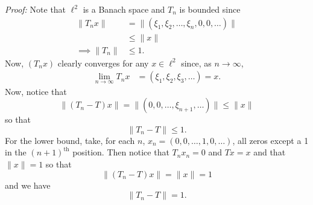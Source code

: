 \documentclass{article}
\begin{document}
\begin{itemize}
    \newline\newline
    \textit{Proof:} Note that $\ell^2$ is a Banach space and $T_n$ is bounded since
    \begin{align*}
        \|T_nx\| &= \|(\xi_1,\xi_2,\dots, \xi_n, 0, 0,\dots)\|\\
        &\leq \|x\|\\
        \implies \|T_n\| &\leq 1.
    \end{align*}
    Now, $(T_nx)$ clearly converges for any $x \in \ell^2$ since, as $n\to \infty$, 
    \begin{align*}
        \lim_{n\to \infty} T_nx &= (\xi_1,\xi_2,\xi_3,\dots) = x.
    \end{align*}
    Now, notice that 
    \[\|(T_n - T)x\| = \|(0,0,\dots, \xi_{n+1}, \dots)\| \leq \|x\|\]
    so that 
    \[\|T_n - T\| \leq 1.\]
    For the lower bound, take, for each $n$, $x_n = (0,0,\dots, 1, 0, \dots)$, all zeros except a 1 in the $(n+1)^{\text{th}}$ position. Then notice that $T_nx_n = 0$ and $Tx = x$ and that $\|x\| = 1$ so that
    \[\|(T_n - T)x\| = \|x\| = 1\]
    and we have
    \[\|T_n - T\| = 1.\]
    


\end{itemize}
\end{document}
